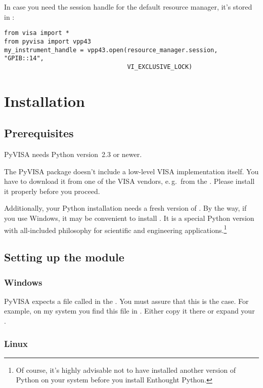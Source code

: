 \documentclass{howto}
\begin{document}
In case you need the session handle for the default resource manager, it's
stored in :
\begin{verbatim}
from visa import *
from pyvisa import vpp43
my_instrument_handle = vpp43.open(resource_manager.session, "GPIB::14",
                                  VI_EXCLUSIVE_LOCK)
\end{verbatim}

\section{Installation}

\subsection{Prerequisites}

PyVISA needs Python version~2.3 or newer.

The PyVISA package doesn't include a low-level VISA implementation itself.  You
have to download it from one of the VISA vendors, e.\,g.\ from the
.  Please install
it properly before you proceed.

Additionally, your Python installation needs a fresh version of
.  By the way,
if you use Windows, it may be convenient to install .  It is a special Python version
with all-included philosophy for scientific and engineering
applications.\footnote{Of course, it's highly advisable not to have installed
  another version of Python on your system before you install Enthought
  Python.}


\subsection{Setting up the module}

\subsubsection{Windows}

PyVISA expects a file called  in the \@.  You
must assure that this is the case.  For example, on my system you find this
file in .  Either copy it there or expand your
\@.


\subsubsection{Linux}
\end{document}
